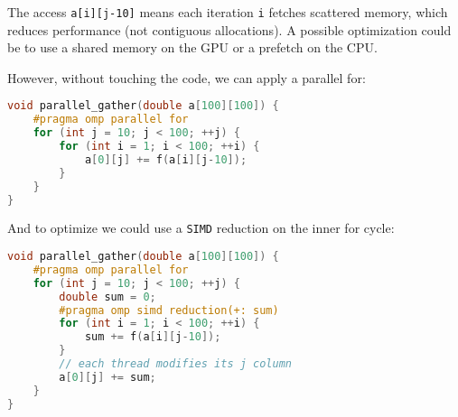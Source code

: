 \begin{enumerate}[label=\Alph*.]
    The access \texttt{a[i][j-10]} means each iteration \texttt{i} fetches scattered memory, which reduces performance (not contiguous allocations). A possible optimization could be to use a shared memory on the GPU or a prefetch on the CPU.

    However, without touching the code, we can apply a parallel for:
    \begin{lstlisting}[language=c++]
void parallel_gather(double a[100][100]) {
    #pragma omp parallel for
    for (int j = 10; j < 100; ++j) {
        for (int i = 1; i < 100; ++i) {
            a[0][j] += f(a[i][j-10]);
        }
    }
}\end{lstlisting}
    And to optimize we could use a \texttt{SIMD} reduction on the inner for cycle:
    \begin{lstlisting}[language=c++]
void parallel_gather(double a[100][100]) {
    #pragma omp parallel for 
    for (int j = 10; j < 100; ++j) {
        double sum = 0;
        #pragma omp simd reduction(+: sum)
        for (int i = 1; i < 100; ++i) {
            sum += f(a[i][j-10]);
        }
        // each thread modifies its j column
        a[0][j] += sum;
    }
}\end{lstlisting}
\end{enumerate}

\newpage

